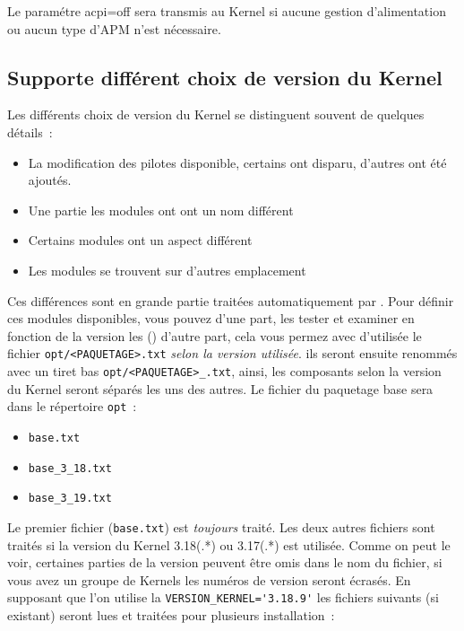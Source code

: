 Le paramétre \og{}acpi=off\fg{} sera transmis au Kernel si aucune gestion d'alimentation ou aucun
type \og{}d'APM\fg{} n'est nécessaire.


\subsection{Supporte différent choix de version du Kernel}

Les différents choix de version du Kernel se distinguent souvent de quelques détails~:

\begin{itemize}
\item La modification des pilotes disponible, certains ont disparu,
   d'autres ont été ajoutés.
\item Une partie les modules ont ont un nom différent
\item Certains modules ont un aspect différent
\item Les modules se trouvent sur d’autres emplacement
\end{itemize}

Ces différences sont en grande partie traitées automatiquement par .
Pour définir ces modules disponibles, vous pouvez d’une part, les tester et
examiner en fonction de la version les
()
d'autre part, cela vous permez avec  d'utilisée le fichier \texttt{opt/<PAQUETAGE>.txt}
\emph{selon la version utilisée}. ils seront ensuite renommés avec un tiret bas
\texttt{opt/<PAQUETAGE>\_<Kernel-Version>.txt}, ainsi, les composants selon la version
du Kernel seront séparés les uns des autres. Le fichier du paquetage \og{}base\fg{}
sera dans le répertoire \texttt{opt}~:

\begin{itemize}
\item \texttt{base.txt}
\item \texttt{base\_3\_18.txt}
\item \texttt{base\_3\_19.txt}
\end{itemize}

Le premier fichier (\texttt{base.txt}) est \emph{toujours} traité. Les deux autres
fichiers sont traités si la version du Kernel \og{}3.18(.*)\fg{} ou \og{}3.17(.*)\fg{} est utilisée. Comme
on peut le voir, certaines parties de la version peuvent être omis dans le nom du
fichier, si vous avez un groupe de Kernels les numéros de version seront \og{}écrasés\fg{}.
En supposant que l'on utilise la \verb+VERSION_KERNEL='3.18.9'+ les fichiers suivants
(si existant) seront lues et traitées pour plusieurs installation~:

